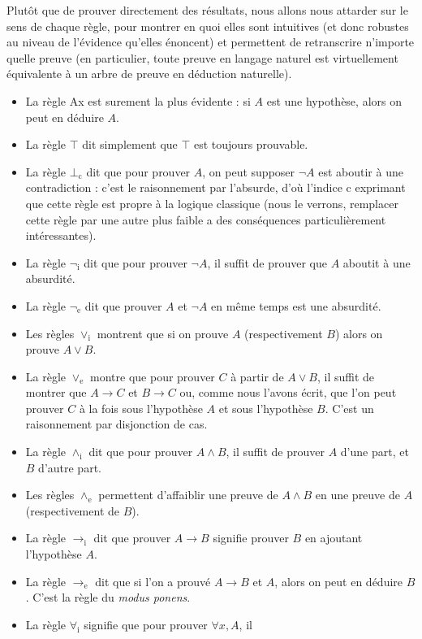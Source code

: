 Plutôt que de prouver directement des résultats, nous allons nous attarder sur
le sens de chaque règle, pour montrer en quoi elles sont intuitives (et donc
robustes au niveau de l'évidence qu'elles énoncent) et permettent de
retranscrire n'importe quelle preuve (en particulier, toute preuve en langage
naturel est virtuellement équivalente à un arbre de preuve en déduction
naturelle).
\begin{itemize}
\item La règle Ax est surement la plus évidente : si $A$ est une hypothèse,
  alors on peut en déduire $A$.
\item La règle $\top$ dit simplement que $\top$ est toujours prouvable.
\item La règle $\bot_\mathrm c$ dit que pour prouver $A$, on peut supposer
  $\lnot A$ est aboutir à une contradiction : c'est le raisonnement par
  l'absurde, d'où l'indice \og c\fg{} exprimant que cette règle est propre à la
  logique classique (nous le verrons, remplacer cette règle par une autre plus
  faible a des conséquences particulièrement intéressantes).
\item La règle $\lnot_\mathrm i$ dit que pour prouver $\lnot A$, il suffit de
  prouver que $A$ aboutit à une absurdité.
\item La règle $\lnot_\mathrm e$ dit que prouver $A$ et $\lnot A$ en même temps
  est une absurdité.
\item Les règles $\lor_\mathrm i$ montrent que si on prouve $A$ (respectivement
  $B$) alors on prouve $A\lor B$.
\item La règle $\lor_\mathrm e$ montre que pour prouver $C$ à partir de
  $A\lor B$, il suffit de montrer que $A\to C$ et $B\to C$ ou, comme nous
  l'avons écrit, que l'on peut prouver $C$ à la fois sous l'hypothèse $A$ et
  sous l'hypothèse $B$. C'est un raisonnement par disjonction de cas.
\item La règle $\land_\mathrm i$ dit que pour prouver $A\land B$, il suffit de
  prouver $A$ d'une part, et $B$ d'autre part.
\item Les règles $\land_\mathrm e$ permettent d'affaiblir une preuve de
  $A\land B$ en une preuve de $A$ (respectivement de $B$).
\item La règle $\to_\mathrm i$ dit que prouver $A\to B$ signifie prouver $B$ en
  ajoutant l'hypothèse $A$.
\item La règle $\to_\mathrm e$ dit que si l'on a prouvé $A\to B$ et $A$, alors on
  peut en déduire $B$. C'est la règle du \textit{modus ponens}.
\item La règle $\forall_\mathrm i$ signifie que pour prouver $\forall x, A$, il

\end{itemize}
